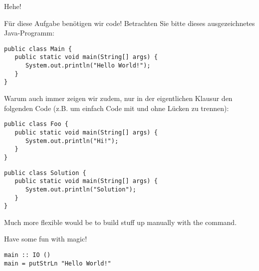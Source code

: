 \begin{exercise}[5]{Hehe!}
\label{ex:second}%

Für diese Aufgabe benötigen wir code!
Betrachten Sie bitte dieses ausgezeichnetes Java-Programm:

\begin{verbatim}
public class Main {
   public static void main(String[] args) {
      System.out.println("Hello World!");
   }
}
\end{verbatim}

\begin{examonly}
Warum auch immer zeigen wir zudem, nur in der eigentlichen Klausur den folgenden Code (z.B. um einfach Code mit und ohne Lücken zu trennen):
\begin{verbatim}
public class Foo {
   public static void main(String[] args) {
      System.out.println("Hi!");
   }
}
\end{verbatim}
\end{examonly}

\begin{solution}
\begin{verbatim}
public class Solution {
   public static void main(String[] args) {
      System.out.println("Solution");
   }
}
\end{verbatim}
\end{solution}

Much more flexible would be to build stuff up manually with the \string\ifinmode\space command.

\begin{solutionbox}
   Have some fun with magic!

\begin{verbatim}
main :: IO ()
main = putStrLn "Hello World!"
\end{verbatim}
\end{solutionbox}
\fi

\end{exercise}
